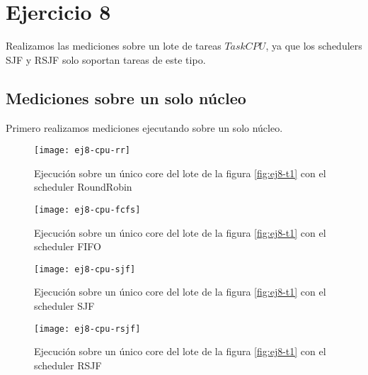 \section{Ejercicio 8}
\label{fig:ej8-intro}
Realizamos las mediciones sobre un lote de tareas $TaskCPU$,
ya que los schedulers SJF y RSJF solo soportan tareas de este tipo.

\begin{center}
\end{center}
\label{fig:ej8-t1}
\vspace*{1em}

\subsection{Mediciones sobre un solo núcleo}

Primero realizamos mediciones ejecutando sobre un solo núcleo.

\begin{figure}[H]
        \centering
        \texttt{[image: ej8-cpu-rr]}
        \caption{Ejecución sobre un único core del lote de la figura
            \ref{fig:ej8-t1} con el scheduler RoundRobin}
        \label{fig:ej8-cpu-rr}
\end{figure}

\begin{figure}[H]
        \centering
        \texttt{[image: ej8-cpu-fcfs]}
        \caption{Ejecución sobre un único core del lote de la figura
            \ref{fig:ej8-t1} con el scheduler FIFO}
        \label{fig:ej8-cpu-fcfs}
\end{figure}

\begin{figure}[H]
        \centering
        \texttt{[image: ej8-cpu-sjf]}
        \caption{Ejecución sobre un único core del lote de la figura
            \ref{fig:ej8-t1} con el scheduler SJF}
        \label{fig:ej8-cpu-sjf}
\end{figure}

\begin{figure}[H]
        \centering
        \texttt{[image: ej8-cpu-rsjf]}
        \caption{Ejecución sobre un único core del lote de la figura
            \ref{fig:ej8-t1} con el scheduler RSJF}
        \label{fig:ej8-cpu-rsjf}
\end{figure}


